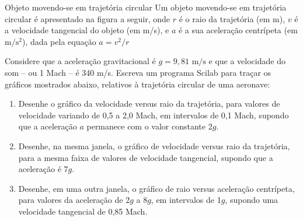 \documentclass[11pt,fleqn]{practice}
\begin{document}
\begin{task}[breakable]{Objeto movendo-se em trajetória circular }{}
  Um objeto movendo-se em trajetória circular é apresentado na figura a
  seguir, onde $r$ é o raio da trajetória (em m), $v$ é a velocidade
  tangencial do objeto (em m/s), e $a$ é a sua aceleração centrípeta (em
  $\text{m}/\text{s}^2$), dada pela equação $ a = v^2/r $

  \begin{center}
  \end{center} 

  Considere que a aceleração gravitacional é $g = 9,81 \text{ m/s}$ e
  que a velocidade do som -- ou 1 Mach -- é 340 m/s.  Escreva um
  programa Scilab para traçar os gráficos mostrados abaixo, relativos à
  trajetória circular de uma aeronave:

  \begin{enumerate}
    \item Desenhe o gráfico da velocidade versus raio da trajetória,
    para valores de velocidade variando de 0,5 a 2,0 Mach, em intervalos
    de 0,1 Mach, supondo que a aceleração $a$ permanece com o valor
    constante 2$g$.
    \item Desenhe, na mesma janela, o gráfico de velocidade
    versus raio da trajetória, para a mesma faixa de valores de
    velocidade tangencial, supondo que a aceleração é 7$g$.
    \item Desenhe, em uma outra janela, o gráfico de raio versus
    aceleração centrípeta, para valores da aceleração de 2$g$ a 8$g$, em
    intervalos de 1$g$, supondo uma velocidade tangencial de 0,85 Mach.
  \end{enumerate}


\end{task}
\end{document}
